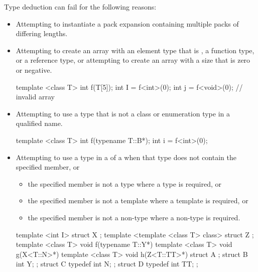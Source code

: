 \pnum
\begin{note}
Type deduction can fail for the following reasons:
\begin{itemize}
\item Attempting to instantiate a pack expansion containing multiple packs of differing lengths.
\item
Attempting to create an array with an element type that is , a
function type, or a reference type, or attempting
to create an array with a size that is zero or negative.
\begin{example}
\begin{codeblock}
template <class T> int f(T[5]);
int I = f<int>(0);
int j = f<void>(0);             // invalid array
\end{codeblock}
\end{example}
\item
Attempting to use a type that is not a class or enumeration type in a qualified name.
\begin{example}
\begin{codeblock}
template <class T> int f(typename T::B*);
int i = f<int>(0);
\end{codeblock}
\end{example}
\item
Attempting to use a type in a  of a
 when
that type does not contain the specified member, or
\begin{itemize}
\item
the specified member is not a type where a type is required, or
\item
the specified member is not a template where a template is required, or
\item
the specified member is not a non-type where a non-type is required.
\end{itemize}
\begin{example}
\begin{codeblock}
template <int I> struct X { };
template <template <class T> class> struct Z { };
template <class T> void f(typename T::Y*) {}
template <class T> void g(X<T::N>*) {}
template <class T> void h(Z<T::TT>*) {}
struct A {};
struct B { int Y; };
struct C {
  typedef int N;
};
struct D {
  typedef int TT;
};


\end{codeblock}
\end{example}
\end{itemize}
\end{note}

